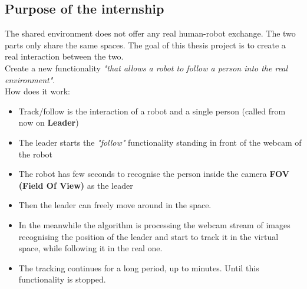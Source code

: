 \subsection{Purpose of the internship}
The shared environment does not offer any real human-robot exchange. The two parts only share the same spaces. The goal of this thesis project is to create a real interaction between the two.\\
Create a new functionality \textit{"that allows a robot to follow a person into the real environment"}.\\
How does it work:
\begin{itemize}
	\item Track/follow is the interaction of a robot and a single person (called from now on \textbf{Leader})
	\item The leader starts the \textit{"follow"} functionality standing in front of the webcam of the robot
	\item The robot has few seconds to recognise the person inside the camera \textbf{FOV (Field Of View)} as the leader
	\item Then the leader can freely move around in the space. 
	\item In the meanwhile the algorithm is processing the webcam stream of images recognising the position of the leader and start to track it in the virtual space, while following it in the real one.
	\item The tracking continues for a long period, up to minutes. Until this functionality is stopped.
\end{itemize}

